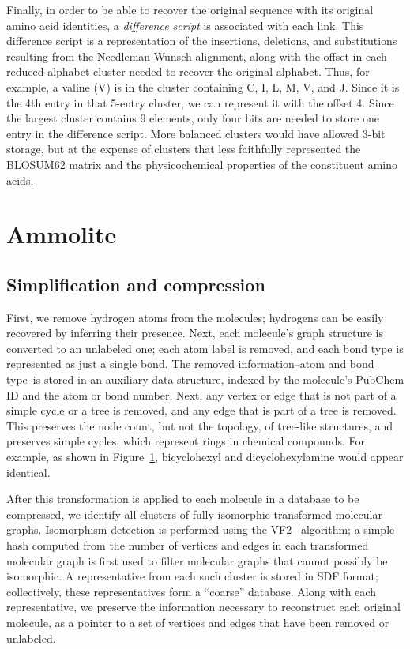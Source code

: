 \documentclass{amsbook}
\theoremstyle{definition}
\theoremstyle{remark}
\numberwithin{equation}{section}
\begin{document}
Finally, in order to be able to recover the original sequence with its original
amino acid identities, a \textit{difference script} is associated with each
link.
This difference script is a representation of the insertions, deletions, and
substitutions resulting from the Needleman-Wunsch alignment, along with the
offset in each reduced-alphabet cluster needed to recover the original alphabet.
Thus, for example, a valine (V) is in the cluster containing C, I, L, M, V, and 
J.
Since it is the 4th entry in that 5-entry cluster, we can represent it with
the offset 4.
Since the largest cluster contains 9 elements, only four bits are needed to
store one entry in the difference script.
More balanced clusters would have allowed 3-bit storage, but at the expense of
clusters that less faithfully represented the BLOSUM62 matrix and the
physicochemical properties of the constituent amino acids.

\section{Ammolite}

\subsection*{Simplification and compression}

First, we remove hydrogen atoms from the molecules; hydrogens can be easily recovered by inferring their 
presence.
Next, each molecule's graph structure is converted to an unlabeled one; each atom label is removed, and each
bond type is represented as just a single bond.
The removed information--atom and bond type--is stored in an auxiliary data structure, indexed by the molecule's
PubChem ID and the atom or bond number.
Next, any vertex or edge that is not part of a simple cycle or a tree is removed, and any edge that is part
of a tree is removed.
This preserves the node count, but not the topology, of tree-like structures, and preserves simple cycles,
which represent rings in chemical compounds.
For example, as shown in Figure~\ref{}, bicyclohexyl and dicyclohexylamine would appear identical.

After this transformation is applied to each molecule in a database to be compressed, we identify all clusters
of fully-isomorphic transformed molecular graphs.
Isomorphism detection is performed using the VF2~\cite{Cordella} algorithm; a simple hash computed from the
number of vertices and edges in each transformed molecular graph is first used to filter molecular graphs that
cannot possibly be isomorphic.
A representative from each such cluster is stored in SDF format; collectively, these representatives form a 
``coarse'' database.
Along with each representative, we preserve the information necessary to reconstruct each original molecule,
as a pointer to a set of vertices and edges that have been removed or unlabeled.
\end{document}

